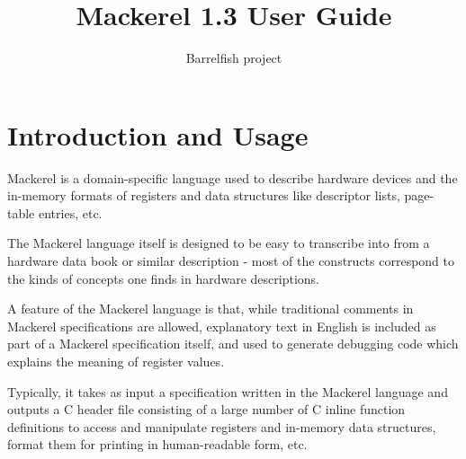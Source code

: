\documentclass[a4paper,11pt,twoside]{report}
\title{Mackerel 1.3 User Guide}
\author{Barrelfish project}
\begin{document}
\maketitle			%

\begin{versionhistory}
\end{versionhistory}

\tableofcontents		%
\cleardoublepage
\setcounter{secnumdepth}{2}

\newcommand{\fnname}[1]{\textit{\texttt{#1}}}%
\newcommand{\datatype}[1]{\textit{\texttt{#1}}}%
\newcommand{\varname}[1]{\texttt{#1}}%
\newcommand{\keywname}[1]{\textbf{\texttt{#1}}}%
\newcommand{\tabindent}{\hspace*{3ex}}%
\newcommand{\Mac}{Mackerel\xspace}




\chapter{Introduction and Usage} 

\Mac is a domain-specific language used to describe hardware devices
and the in-memory formats of registers and data structures like
descriptor lists, page-table entries, etc.   

The \Mac language itself is designed to be easy to transcribe into
from a hardware data book or similar description - most of the
constructs correspond to the kinds of concepts one finds in hardware
descriptions. 

A feature of the \Mac language is that, while traditional comments in
\Mac specifications are allowed, explanatory text in English is
included as part of a \Mac specification itself, and used to generate
debugging code which explains the meaning of register values. 

 Typically, it takes as input a specification written in the
Mackerel language and outputs a C header file consisting of a large
number of C inline function definitions to access and manipulate
registers and in-memory data structures, format them for printing in
human-readable form, etc.  
\end{document}
